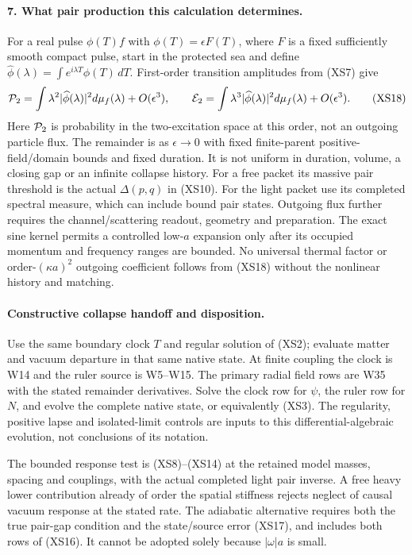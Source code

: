 \documentclass[11pt]{article}
\begin{document}
\paragraph{7. What pair production this calculation determines.}
For a real pulse $\phi(T)f$ with $\phi(T)=\epsilon F(T)$,
where $F$ is a fixed sufficiently smooth compact pulse,
start in the protected sea and define
$\widehat\phi(\lambda)=\int e^{i\lambda T}\phi(T)\,dT$.
First-order transition amplitudes from (XS7) give
\begin{equation}
 {\cal P}_2=\int \lambda^2|\widehat\phi(\lambda)|^2
                         d\mu_f(\lambda)+O(\epsilon^3),\qquad
 {\cal E}_2=\int \lambda^3|\widehat\phi(\lambda)|^2
                         d\mu_f(\lambda)+O(\epsilon^3).
 \tag{XS18}
\end{equation}
Here ${\cal P}_2$ is probability in the two-excitation space
at this order, not an outgoing particle flux.
The remainder is as $\epsilon\to0$ with fixed finite-parent
positive-field/domain bounds and fixed duration.
It is not uniform in duration, volume, a closing gap or an
infinite collapse history.
For a free packet its massive pair threshold is the actual
$\Delta(p,q)$ in (XS10).  For the light packet use its
completed spectral measure, which can include bound pair
states.  Outgoing flux further requires the channel/scattering
readout, geometry and preparation.  The exact sine kernel
permits a controlled low-$a$ expansion only after its occupied
momentum and frequency ranges are bounded.  No universal
thermal factor or order-$(\kappa a)^2$ outgoing coefficient
follows from (XS18) without the nonlinear history and matching.

\paragraph{Constructive collapse handoff and disposition.}
Use the same boundary clock $T$ and regular solution of
(XS2); evaluate matter and vacuum departure in that same
native state.  At finite coupling the clock is W14 and the
ruler source is W5--W15.  The primary radial field rows are
W35 with the stated remainder derivatives.  Solve the clock
row for $\psi$, the ruler row for $N$, and evolve the complete
native state, or equivalently (XS3).  The regularity, positive
lapse and isolated-limit controls are inputs to this
differential-algebraic evolution, not conclusions of its notation.

The bounded response test is (XS8)--(XS14) at the retained
model masses, spacing and couplings, with the actual completed
light pair inverse.  A free heavy lower contribution already
of order the spatial stiffness rejects neglect of causal
vacuum response at the stated rate.  The adiabatic alternative
requires both the true pair-gap condition and the state/source
error (XS17), and includes both rows of (XS16).  It cannot be
adopted solely because $|\omega|a$ is small.
\end{document}

